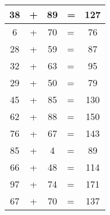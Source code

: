 \documentclass[15pt,ngerman]{scrartcl}
\begin{document}
\huge
\begin{longtable}{cccp{8cm}c}38 &+ &89 &= &127 \\ \hline
6 &+ &70 &= &76 \\ \hline
28 &+ &59 &= &87 \\ \hline
32 &+ &63 &= &95 \\ \hline
29 &+ &50 &= &79 \\ \hline
45 &+ &85 &= &130 \\ \hline
62 &+ &88 &= &150 \\ \hline
76 &+ &67 &= &143 \\ \hline
85 &+ &4 &= &89 \\ \hline
66 &+ &48 &= &114 \\ \hline
97 &+ &74 &= &171 \\ \hline
67 &+ &70 &= &137 \\ \hline
\end{longtable}
\end{document}
